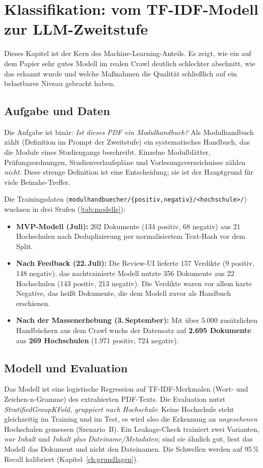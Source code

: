 \chapter{Klassifikation: vom TF-IDF-Modell zur LLM-Zweitstufe}\label{ch:klassifikation}

Dieses Kapitel ist der Kern des Machine-Learning-Anteils. Es zeigt, wie ein auf dem Papier sehr gutes Modell im realen Crawl deutlich schlechter abschnitt, wie das erkannt wurde und welche Maßnahmen die Qualität schließlich auf ein belastbares Niveau gebracht haben.

\section{Aufgabe und Daten}
Die Aufgabe ist binär: \emph{Ist dieses PDF ein Modulhandbuch?} Als Modulhandbuch zählt (Definition im Prompt der Zweitstufe) ein systematisches Handbuch, das die Module eines Studiengangs beschreibt. Einzelne Modulblätter, Prüfungsordnungen, Studienverlaufspläne und Vorlesungsverzeichnisse zählen \emph{nicht}. Diese strenge Definition ist eine Entscheidung; sie ist der Hauptgrund für viele Beinahe-Treffer.

Die Trainingsdaten (\texttt{modulhandbuecher/\{positiv,negativ\}/<hochschule>/}) wuchsen in drei Stufen (\cref{tab:modelle}):
\begin{itemize}
  \item \textbf{MVP-Modell (Juli):} 202 Dokumente (134 positiv, 68 negativ) aus 21 Hochschulen nach Deduplizierung per normalisiertem Text-Hash vor dem Split.
  \item \textbf{Nach Feedback (22.\,Juli):} Die Review-UI lieferte 157 Verdikte (9 positiv, 148 negativ), das nachtrainierte Modell nutzte 356 Dokumente aus 22 Hochschulen (143 positiv, 213 negativ). Die Verdikte waren vor allem harte Negative, das heißt Dokumente, die dem Modell zuvor als Handbuch erschienen.
  \item \textbf{Nach der Massenerhebung (3.\,September):} Mit über 5.000 zusätzlichen Handbüchern aus dem Crawl wuchs der Datensatz auf \textbf{2.695 Dokumente} aus \textbf{269 Hochschulen} (1.971 positiv, 724 negativ).
\end{itemize}

\section{Modell und Evaluation}
Das Modell ist eine logistische Regression auf TF-IDF-Merkmalen (Wort- und Zeichen-n-Gramme) des extrahierten PDF-Texts. Die Evaluation nutzt \emph{StratifiedGroupKFold, gruppiert nach Hochschule}: Keine Hochschule steht gleichzeitig im Training und im Test, es wird also die Erkennung an \emph{ungesehenen} Hochschulen gemessen (Szenario~B). Ein Leakage-Check trainiert zwei Varianten, \emph{nur Inhalt} und \emph{Inhalt plus Dateiname/Metadaten}; sind sie ähnlich gut, liest das Modell das Dokument und nicht den Dateinamen. Die Schwellen werden auf 95\,\% Recall kalibriert (Kapitel~\ref{ch:grundlagen}).

